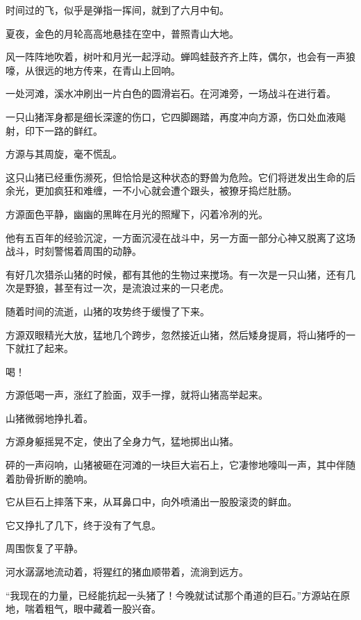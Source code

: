
\begin{this_body}



时间过的飞，似乎是弹指一挥间，就到了六月中旬。

夏夜，金色的月轮高高地悬挂在空中，普照青山大地。

风一阵阵地吹着，树叶和月光一起浮动。蝉鸣蛙鼓齐齐上阵，偶尔，也会有一声狼嚎，从很远的地方传来，在青山上回响。

一处河滩，溪水冲刷出一片白色的圆滑岩石。在河滩旁，一场战斗在进行着。

一只山猪浑身都是细长深邃的伤口，它四脚踢踏，再度冲向方源，伤口处血液飚射，印下一路的鲜红。

方源与其周旋，毫不慌乱。

这只山猪已经重伤濒死，但恰恰是这种状态的野兽为危险。它们将迸发出生命的后余光，更加疯狂和难缠，一不小心就会遭个跟头，被獠牙捣烂肚肠。

方源面色平静，幽幽的黑眸在月光的照耀下，闪着冷冽的光。

他有五百年的经验沉淀，一方面沉浸在战斗中，另一方面一部分心神又脱离了这场战斗，时刻警惕着周围的动静。

有好几次猎杀山猪的时候，都有其他的生物过来搅场。有一次是一只山猪，还有几次是野狼，甚至有过一次，是流浪过来的一只老虎。

随着时间的流逝，山猪的攻势终于缓慢了下来。

方源双眼精光大放，猛地几个跨步，忽然接近山猪，然后矮身提肩，将山猪呼的一下就扛了起来。

喝！

方源低喝一声，涨红了脸面，双手一撑，就将山猪高举起来。

山猪微弱地挣扎着。

方源身躯摇晃不定，使出了全身力气，猛地掷出山猪。

砰的一声闷响，山猪被砸在河滩的一块巨大岩石上，它凄惨地嚎叫一声，其中伴随着肋骨折断的脆响。

它从巨石上摔落下来，从耳鼻口中，向外喷涌出一股股滚烫的鲜血。

它又挣扎了几下，终于没有了气息。

周围恢复了平静。

河水潺潺地流动着，将猩红的猪血顺带着，流淌到远方。

“我现在的力量，已经能抗起一头猪了！今晚就试试那个甬道的巨石。”方源站在原地，喘着粗气，眼中藏着一股兴奋。


\end{this_body}
